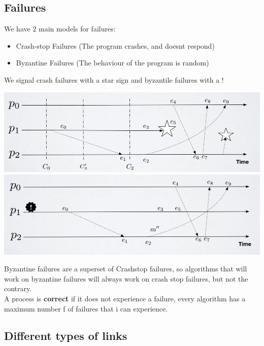 \documentclass[11pt, a4paper]{article}
\begin{document}
\subsection{Failures}
We have 2 main models for failures:\\
\begin{itemize}
    \item Crash-stop Failures (The program crashes, and doesnt respond)
    \item Byzantine Failures (The behaviour of the program is random)
\end{itemize}
We signal crash failures with a star sign and byzantile failures with a !
\begin{center}
    \includegraphics[scale=0.6]{img/crash.png}\\
    \includegraphics[scale=0.6]{img/byz.png}
\end{center}
Byzantine failures are a superset of Crashstop failures, so algorithms that will work on byzantine failures will always work on crash stop failures, but not the contrary.\\
A process is \textbf{correct} if it does not experience a failure, every algorithm has a maximum number f of failures that i can experience.

\subsection{Different types of links}
\end{document}
